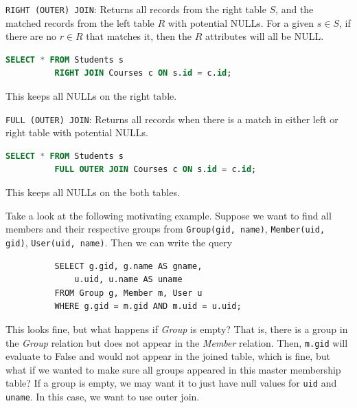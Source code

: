 \documentclass{article}
\begin{document}
      \begin{definition}
        \texttt{RIGHT (OUTER) JOIN}: Returns all records from the right table $S$, and the matched records from the left table $R$ with potential NULLs. For a given $s \in S$, if there are no $r \in R$ that matches it, then the $R$ attributes will all be NULL. 
        \begin{lstlisting}[language=SQL]
          SELECT * FROM Students s
          RIGHT JOIN Courses c ON s.id = c.id;
        \end{lstlisting}
        This keeps all NULLs on the right table. 
      \end{definition}

      \begin{definition}
        \texttt{FULL (OUTER) JOIN}: Returns all records when there is a match in either left or right table with potential NULLs.
        \begin{lstlisting}[language=SQL]
          SELECT * FROM Students s
          FULL OUTER JOIN Courses c ON s.id = c.id;
        \end{lstlisting}
        This keeps all NULLs on the both tables. 
      \end{definition}

      \begin{example}
        Take a look at the following motivating example. Suppose we want to find all members and their respective groups from \texttt{Group(gid, name)}, \texttt{Member(uid, gid)}, \texttt{User(uid, name)}. Then we can write the query 
        \begin{lstlisting}
          SELECT g.gid, g.name AS gname, 
              u.uid, u.name AS uname 
          FROM Group g, Member m, User u 
          WHERE g.gid = m.gid AND m.uid = u.uid; 
        \end{lstlisting}
        This looks fine, but what happens if \textit{Group} is empty? That is, there is a group in the \textit{Group} relation but does not appear in the \textit{Member} relation. Then, \texttt{m.gid} will evaluate to False and would not appear in the joined table, which is fine, but what if we wanted to make sure all groups appeared in this master membership table? If a group is empty, we may want it to just have null values for \texttt{uid} and \texttt{uname}. In this case, we want to use outer join. 
      \end{example}
\end{document}

